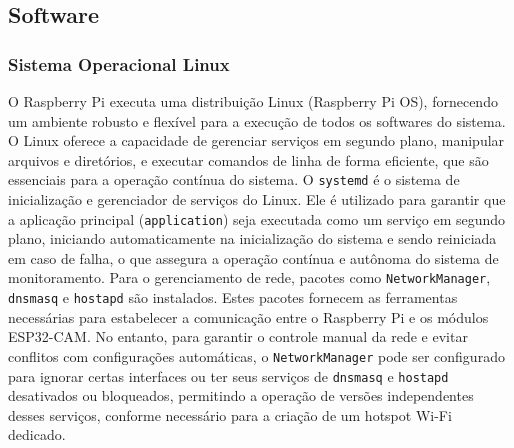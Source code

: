 \documentclass[12pt, a4paper]{article}
\begin{document}
	\subsection{Software}
	\subsubsection{Sistema Operacional Linux}
	O Raspberry Pi executa uma distribuição Linux (Raspberry Pi OS), fornecendo um ambiente robusto e flexível para a execução de todos os softwares do sistema. O Linux oferece a capacidade de gerenciar serviços em segundo plano, manipular arquivos e diretórios, e executar comandos de linha de forma eficiente, que são essenciais para a operação contínua do sistema. O \texttt{systemd} é o sistema de inicialização e gerenciador de serviços do Linux. Ele é utilizado para garantir que a aplicação principal (\texttt{application}) seja executada como um serviço em segundo plano, iniciando automaticamente na inicialização do sistema e sendo reiniciada em caso de falha, o que assegura a operação contínua e autônoma do sistema de monitoramento. Para o gerenciamento de rede, pacotes como \texttt{NetworkManager}, \texttt{dnsmasq} e \texttt{hostapd} são instalados. Estes pacotes fornecem as ferramentas necessárias para estabelecer a comunicação entre o Raspberry Pi e os módulos ESP32-CAM. No entanto, para garantir o controle manual da rede e evitar conflitos com configurações automáticas, o \texttt{NetworkManager} pode ser configurado para ignorar certas interfaces ou ter seus serviços de \texttt{dnsmasq} e \texttt{hostapd} desativados ou bloqueados, permitindo a operação de versões independentes desses serviços, conforme necessário para a criação de um hotspot Wi-Fi dedicado.
	
\end{document}

